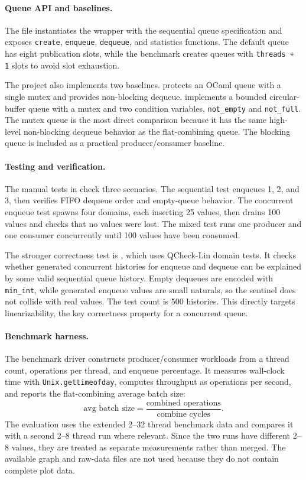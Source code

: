 \documentclass[11pt,a4paper]{article}
\begin{document}
\paragraph{Queue API and baselines.}
The file  instantiates the wrapper with the sequential queue specification and exposes \texttt{create}, \texttt{enqueue}, \texttt{dequeue}, and statistics functions. The default queue has eight publication slots, while the benchmark creates queues with \texttt{threads + 1} slots to avoid slot exhaustion.

The project also implements two baselines.  protects an OCaml queue with a single mutex and provides non-blocking dequeue.  implements a bounded circular-buffer queue with a mutex and two condition variables, \texttt{not\_empty} and \texttt{not\_full}. The mutex queue is the most direct comparison because it has the same high-level non-blocking dequeue behavior as the flat-combining queue. The blocking queue is included as a practical producer/consumer baseline.

\paragraph{Testing and verification.}
The manual tests in  check three scenarios. The sequential test enqueues 1, 2, and 3, then verifies FIFO dequeue order and empty-queue behavior. The concurrent enqueue test spawns four domains, each inserting 25 values, then drains 100 values and checks that no values were lost. The mixed test runs one producer and one consumer concurrently until 100 values have been consumed.

The stronger correctness test is , which uses QCheck-Lin domain tests. It checks whether generated concurrent histories for enqueue and dequeue can be explained by some valid sequential queue history. Empty dequeues are encoded with \texttt{min\_int}, while generated enqueue values are small naturals, so the sentinel does not collide with real values. The test count is 500 histories. This directly targets linearizability, the key correctness property for a concurrent queue.

\paragraph{Benchmark harness.}
The benchmark driver constructs producer/consumer workloads from a thread count, operations per thread, and enqueue percentage. It measures wall-clock time with \texttt{Unix.gettimeofday}, computes throughput as operations per second, and reports the flat-combining average batch size:
\[
\text{avg batch size} =
\frac{\text{combined operations}}{\text{combine cycles}}.
\]
The evaluation uses the extended 2--32 thread benchmark data and compares it with a second 2--8 thread run where relevant. Since the two runs have different 2--8 values, they are treated as separate measurements rather than merged. The available graph and raw-data files are not used because they do not contain complete plot data.
\end{document}
